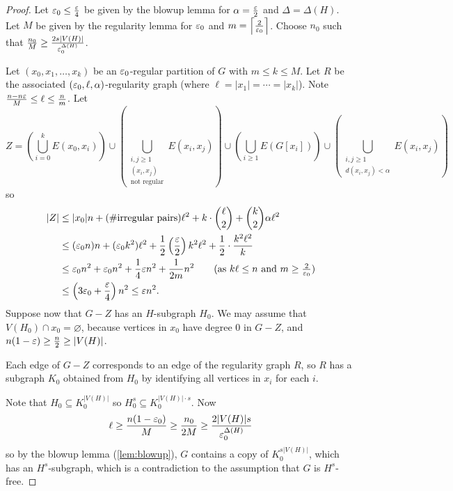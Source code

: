 \documentclass[main.tex]{subfiles}
\begin{document}
\begin{proof}
  Let $\varepsilon_0\leq\frac{\varepsilon}{4}$ be given by the blowup lemma for
  $\alpha = \frac{\varepsilon} 2$ and $\Delta = \Delta(H)$.
  Let $M$ be given by the regularity lemma for $\varepsilon_0$ and
  $m = \left\lceil \frac{2}{\varepsilon_0} \right\rceil$.
  Choose $n_0$ such that $\frac{n_0}{M}\geq\frac{2s|V(H)|}{\varepsilon_0^{\Delta(H)}}$.

  Let $(x_0,x_1,\ldots,x_k)$ be an $\varepsilon_0$-regular partition of $G$ with
  $m\leq k\leq M$.
  Let $R$ be the associated $(\varepsilon_0,\ell,\alpha)$-regularity graph
  (where $\ell = |x_1| = \cdots = |x_k|$).
  Note $\frac{n-n\varepsilon}{M}\leq\ell\leq\frac{n}{m}$.
  Let
  \[
    Z = \left(\bigcup_{i=0}^k E(x_0,x_i)\right)\cup
    \left(\bigcup_{\substack{i,j\geq 1\\(x_i,x_j)\\\text{not regular}}} E(x_i,x_j)\right)
        \cup\left(\bigcup_{i\geq 1} E(G[x_i])\right)\cup
        \left(\bigcup_{\substack{i,j\geq 1\\d(x_i,x_j) < \alpha}}E(x_i,x_j)\right)
  \]
  so
  \begin{align*}
    |Z|&\leq|x_0|n + (\#\text{irregular pairs})\ell^2
    + k\cdot\binom{\ell}{2} + \binom{k}{2}\alpha\ell^2 \\
       &\leq(\eps_0 n)n + (\eps_0 k^2)\ell^2 + \half\left(\frac{\eps}{2}\right)k^2\ell^2
         + \half\cdot\frac{k^2\ell^2}{k} \\
       &\leq\eps_0 n^2 + \eps_0 n^2 + \frac 1 4\eps n^2 + \frac{1}{2m}n^2
         \tag{as $k\ell\leq n$ and $m\geq\frac{2}{\eps_0}$} \\
       &\leq\left(3\eps_0 + \frac{\eps}{4}\right)n^2\leq\eps n^2.
  \end{align*}
  Suppose now that $G - Z$ has an $H$-subgraph $H_0$.
  We may assume that $V(H_0)\cap x_0 = \varnothing$, because vertices in $x_0$
  have degree 0 in $G - Z$, and $n(1-\varepsilon)\geq\frac n 2\geq|V(H)|$.

  Each edge of $G - Z$ corresponds to an edge of the regularity graph $R$,
  so $R$ has a subgraph $K_0$ obtained from $H_0$ by identifying all vertices
  in $x_i$ for each $i$.

  Note that $H_0\subseteq K_0^{|V(H)|}$ so $H_0^s\subseteq K_0^{|V(H)|\cdot s}$.
  Now
  \[
    \ell\geq\frac{n(1-\varepsilon_0)}{M}\geq\frac{n_0}{2M}\geq\frac{2|V(H)|s}{\varepsilon_0^{\Delta(H)}}
  \]
  so by the blowup lemma (\th\ref{lem:blowup}), $G$ contains a copy of
  $K_0^{s|V(H)|}$, which has an $H^s$-subgraph, which is a contradiction to the
  assumption that $G$ is $H^s$-free.
\end{proof}
\end{document}

